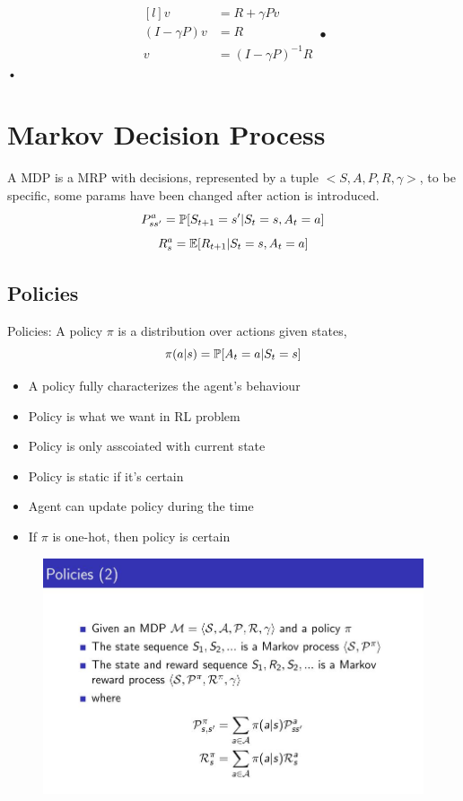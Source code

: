 \documentclass[10pt, a4paper, twocolumn]{article} %
\begin{document}
\begin{equation*}
	\begin{aligned}[l]
		v &= R + \gamma P v \\
		(I - \gamma P)v &= R \\
		v &= (I - \gamma P)^{-1}R
	\end{aligned}•	
\end{equation*}•


\section{Markov Decision Process}
A MDP is a MRP with decisions, represented by a tuple $<S, A, P, R ,\gamma>$, 
to be specific, some params have been changed after action is introduced. 
$$P_{ss'}^a = \Bbb{P}[S_{t+1} = s' | S_{t} = s, A_{t} = a]$$ 
$$R^{a}_{s} = \Bbb{E}[R_{t+1} | S_{t} = s, A_{t} = a]$$

\subsection{Policies}

Policies: A policy $\pi$ is a distribution over actions given states, 
$$\pi(a|s) = \Bbb{P}[A_{t} = a | S_{t} = s]$$

\begin{itemize}
\item{A policy fully characterizes the agent's behaviour}
\item{Policy is what we want in RL problem}
\item{Policy is only asscoiated with current state}
\item{Policy is static if it's certain}
\item{Agent can update policy during the time}
\item{If $\pi$ is one-hot, then policy is certain}

\end{itemize}

\begin{figure}[h]
	\begin{centering}
		\includegraphics[width = \linewidth]{policy.jpg}
	\end{centering}
\end{figure}
\end{document}
